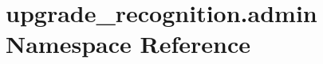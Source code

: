 \hypertarget{namespaceupgrade__recognition_1_1admin}{\section{upgrade\-\_\-recognition.\-admin Namespace Reference}
\label{namespaceupgrade__recognition_1_1admin}
}
